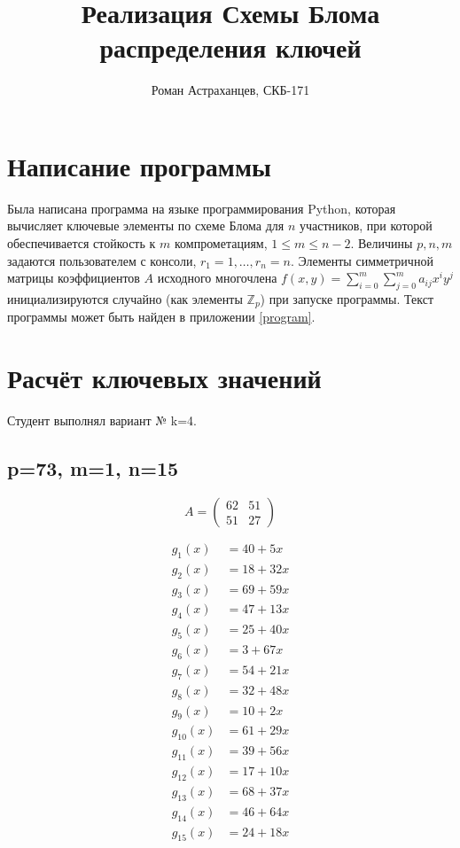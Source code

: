 \documentclass[a4paper,12pt]{article}
\title{Реализация Схемы Блома распределения ключей }
\author{Роман Астраханцев, СКБ-171}
\begin{document}
	\maketitle
	
	\section{Написание программы}
	Была написана программа на языке программирования Python, которая вычисляет ключевые элементы по схеме Блома для $n$ участников, при которой обеспечивается стойкость к $m$ компрометациям, $1\le m \le n-2$. Величины $p, n, m$ задаются пользователем с консоли, $r_1=1, \dots, r_n=n$. Элементы симметричной матрицы коэффициентов $A$ исходного многочлена $f(x,y) = \sum_{i=0}^{m} \sum_{j=0}^{m} a_{i j} x^i y^j$ инициализируются случайно (как элементы $\mathbb{Z}_p$) при запуске программы. Текст программы может быть найден в приложении \ref{program}.
	
	\section{Расчёт ключевых значений}
	
	Студент выполнял вариант № k=4.

	\subsection{p=73, m=1, n=15}
	
	\[
	A = \begin{pmatrix}
		62 & 51 \\
		51 & 27 
	\end{pmatrix}
	\]
	
	\begin{align*}	
		g_1(x)  &= 40 + 5 x  \\
		g_2(x)  &= 18 + 32 x \\
		g_3(x)  &= 69 + 59 x \\
		g_4(x)  &= 47 + 13 x \\
		g_5(x)  &= 25 + 40 x \\
		g_6(x)  &= 3 + 67 x  \\
		g_7(x)  &= 54 + 21 x \\
		g_8(x)  &= 32 + 48 x \\
		g_9(x)  &= 10 + 2 x  \\
		g_{10}(x) &= 61 + 29 x \\
		g_{11}(x) &= 39 + 56 x \\
		g_{12}(x) &= 17 + 10 x \\
		g_{13}(x) &= 68 + 37 x \\
		g_{14}(x) &= 46 + 64 x \\
		g_{15}(x) &= 24 + 18 x
	\end{align*}	
		
\end{document}

